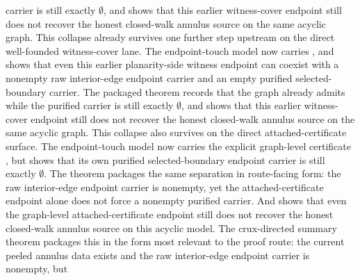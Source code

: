 \documentclass[11pt]{article}
\begin{document}
carrier is still exactly \(\emptyset\), and
shows that this earlier witness-cover endpoint still does not recover the
honest closed-walk annulus source on the same acyclic graph.
This collapse already survives one further step upstream on the direct
well-founded witness-cover lane.  The endpoint-touch model now carries
, and
shows that even this earlier planarity-side witness endpoint can coexist with a
nonempty raw interior-edge endpoint carrier and an empty purified
selected-boundary carrier.  The packaged theorem
records that the graph already admits
 while the purified
carrier is still exactly \(\emptyset\), and
shows that this earlier witness-cover endpoint still does not recover the
honest closed-walk annulus source on the same acyclic graph.
This collapse also survives on the direct attached-certificate
surface.  The endpoint-touch model now carries the explicit graph-level
certificate
, but
 shows that its own
purified selected-boundary endpoint carrier is still exactly \(\emptyset\).
The theorem
packages the same separation in route-facing form: the raw interior-edge
endpoint carrier is nonempty, yet the attached-certificate endpoint alone does
not force a nonempty purified carrier.  And
shows that even the graph-level attached-certificate endpoint still does not
recover the honest closed-walk annulus source on this acyclic model.
The crux-directed summary theorem
packages this in the form most relevant to the proof route: the current peeled
annulus data exists and the raw interior-edge endpoint carrier is nonempty, but
\end{document}
